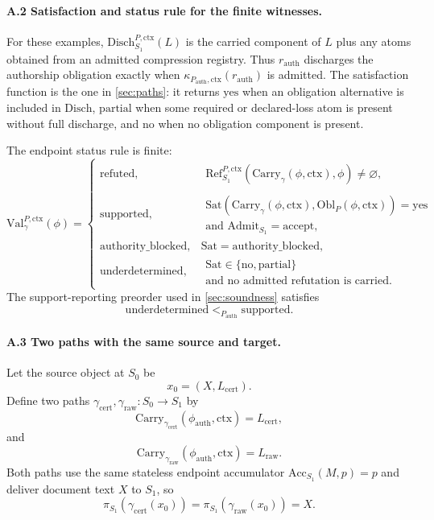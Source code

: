 \documentclass[11pt,twoside]{article}
\theoremstyle{definition}
\newcommand{\Obl}{\mathrm{Obl}}
\newcommand{\Carry}{\mathrm{Carry}}
\newcommand{\Sat}{\mathrm{Sat}}
\newcommand{\Admit}{\mathrm{Admit}}
\newcommand{\Disch}{\mathrm{Disch}}
\newcommand{\Val}{\mathrm{Val}}
\newcommand{\Acc}{\mathrm{Acc}}
\newcommand{\ctx}{\mathrm{ctx}}
\newcommand{\supported}{\mathrm{supported}}
\newcommand{\refuted}{\mathrm{refuted}}
\newcommand{\underdetermined}{\mathrm{underdetermined}}
\newcommand{\authorityblocked}{\mathrm{authority\_blocked}}
\begin{document}
\paragraph{A.2 Satisfaction and status rule for the finite witnesses.}
For these examples, $\Disch_{S_1}^{P,\ctx}(L)$ is the carried component of $L$
plus any atoms obtained from an admitted compression registry. Thus
$r_{\mathrm{auth}}$ discharges the authorship obligation exactly when
$\kappa_{P_{\mathrm{auth}},\ctx}(r_{\mathrm{auth}})$ is admitted. The
satisfaction function is the one in \cref{sec:paths}: it returns $\mathrm{yes}$
when an obligation alternative is included in $\Disch$, $\mathrm{partial}$ when
some required or declared-loss atom is present without full discharge, and
$\mathrm{no}$ when no obligation component is present.

The endpoint status rule is finite:
\[
  \Val_\gamma^{P,\ctx}(\phi)=
  \begin{cases}
    \refuted,
      & \begin{gathered}
        \mathrm{Ref}_{S_1}^{P,\ctx}
          (\Carry_\gamma(\phi,\ctx),\phi)\neq\varnothing,
        \end{gathered}\\
    \supported,
      & \begin{gathered}
        \Sat(\Carry_\gamma(\phi,\ctx),\Obl_P(\phi,\ctx))=\mathrm{yes}\\
        \text{and } \Admit_{S_1}=\mathrm{accept},
        \end{gathered}\\
    \authorityblocked, & \Sat=\authorityblocked,\\
    \underdetermined,
      & \begin{gathered}
        \Sat\in\{\mathrm{no},\mathrm{partial}\}\\
        \text{and no admitted refutation is carried}.
        \end{gathered}
  \end{cases}
\]
The support-reporting preorder used in \cref{sec:soundness} satisfies
\[
  \underdetermined <_{P_{\mathrm{auth}}} \supported.
\]

\paragraph{A.3 Two paths with the same source and target.}
Let the source object at $S_0$ be
\[
  x_0=(X,L_{\mathrm{cert}}).
\]
Define two paths $\gamma_{\mathrm{cert}},\gamma_{\mathrm{raw}}:S_0\to S_1$ by
\[
  \Carry_{\gamma_{\mathrm{cert}}}(\phi_{\mathrm{auth}},\ctx)
  =
  L_{\mathrm{cert}},
\]
and
\[
  \Carry_{\gamma_{\mathrm{raw}}}(\phi_{\mathrm{auth}},\ctx)
  =
  L_{\mathrm{raw}}.
\]
Both paths use the same stateless endpoint accumulator
$\Acc_{S_1}(M,p)=p$ and deliver document text $X$ to $S_1$, so
\[
  \pi_{S_1}(\gamma_{\mathrm{cert}}(x_0))
  =
  \pi_{S_1}(\gamma_{\mathrm{raw}}(x_0))
  =
  X.
\]
\end{document}
